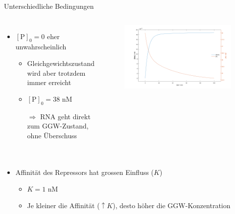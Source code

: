 \documentclass[11pt,aspectratio=169,reqno]{beamer}
\begin{document}
\begin{frame}{Unterschiedliche Bedingungen}
    \begin{columns}
        \begin{itemize}
            \item $[\text{P}]_0=0$ eher unwahrscheinlich
            \begin{itemize}
                \item Gleichgewichtszustand wird aber trotzdem immer erreicht
                \item $[\text{P}]_0=38\text{ nM}$
                \item[$\Rightarrow$] RNA geht direkt zum GGW-Zustand, ohne Überschuss
            \end{itemize}
        \end{itemize}
        
        \begin{figure}
            \centering
            \includegraphics[width=\linewidth]{images/simulations/negative_autoregulation_high_protein.m.png}
        \end{figure}
    \end{columns}

    \begin{columns}
        \begin{itemize}
            \item Affinität des Repressors hat grossen Einfluss ($K$)
            \begin{itemize}
                \item $K=1\text{ nM}$
                \item Je kleiner die Affinität ($\uparrow K$), desto höher die GGW-Konzentration
            \end{itemize}
        \end{itemize}


\end{columns}
\end{frame}
\end{document}
